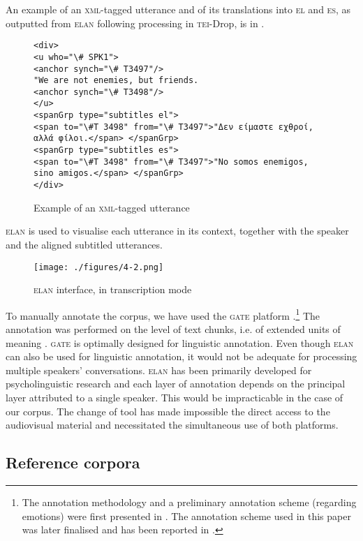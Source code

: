 \documentclass[output=paper]{LSP/langsci}
\begin{document}
An example of an \textsc{xml}-tagged utterance and of its translations into \textsc{el} and \textsc{es}, as outputted from \textsc{elan} following processing in \textsc{tei}-\textsc{D}rop, is in .

\begin{figure}
\caption{Example of an \textsc{xml}-tagged utterance} \label{fig:2:2}
\begin{lstlisting}
<div>
<u who="\# SPK1">
<anchor synch="\# T3497"/>
"We are not enemies, but friends.
<anchor synch="\# T3498"/>
</u>
<spanGrp type="subtitles el">
<span to="\#T 3498" from="\# T3497">"Δεν είμαστε εχθροί, αλλά φίλοι.</span> </spanGrp>
<spanGrp type="subtitles es">
<span to="\#T 3498" from="\# T3497">"No somos enemigos, sino amigos.</span> </spanGrp>
</div>
\end{lstlisting}
\end{figure}


\textsc{elan} is used to visualise each utterance in its context, together with the speaker and the aligned subtitled utterances.

\begin{figure}
\texttt{[image: ./figures/4-2.png]}
\caption{\textsc{elan} interface, in transcription mode}
\end{figure}

To manually annotate the corpus, we have used the \textsc{gate} platform \citep{Cunningham2002}.\footnote{The annotation methodology and a preliminary annotation scheme (regarding emotions) were first presented in \citet{Mouka2012}. The annotation scheme used in this paper was later finalised and has been reported in \citet{Mouka2014}.} The annotation was performed on the level of text chunks, i.e. of extended units of meaning \citep{Sinclair1996a}. \textsc{gate} is optimally designed for linguistic annotation. Even though \textsc{elan} can also be used for linguistic annotation, it would not be adequate for processing multiple speakers' conversations. \textsc{elan} has been primarily developed for psycholinguistic research and each layer of annotation depends on the principal layer attributed to a single speaker. This would be impracticable in the case of our corpus. The change of tool has made impossible the direct access to the audiovisual material and necessitated the simultaneous use of both platforms.

\subsection{Reference corpora} \label{sec:2:3:3}
\end{document}

